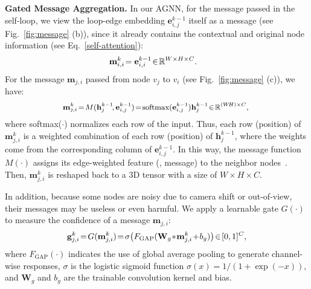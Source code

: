 \documentclass[10pt,twocolumn,letterpaper]{article}
\begin{document}
\noindent\textbf{Gated Message Aggregation.}
In our AGNN, for the message passed in the self-loop, we view the loop-edge embedding $\mathbf{e}_{i,j}^{k-1}$ itself as a message (see Fig.~\ref{fig:message} (b)), since it already contains the contextual and original node information (see Eq.~\ref{self-attention}):
	\vspace*{-3pt}
\begin{equation}
\begin{aligned}
\mathbf{m}_{i,i}^k&\!=\mathbf{e}^{k-1}_{i,i}  \!\in\!  \mathbb{R}^{ W\times H \times C}.
\label{message1}
\end{aligned}
	\vspace*{-3pt}
\end{equation}
For the message $\mathbf{m}_{j,i}$ passed from node $v_j$ to $v_i$ (see Fig.~\ref{fig:message} (c)), we have:
	\vspace*{-2pt}
\begin{equation}\small
\begin{aligned}
\!\!\mathbf{m}_{j,i}^k\!=\!M(\mathbf{h}_j^{k-1}\!, \mathbf{e}^{k-1}_{i,j}) \!=\! \text{softmax}(\mathbf{e}^{k-1}_{i,j}) \mathbf{h}_j^{k-1 }   \!\in\!  \mathbb{R}^{ (W\!H) \times C},
\label{message2}
\end{aligned}
	\vspace*{-2pt}
\end{equation}
where softmax($\cdot$) normalizes each row of the input. Thus, each row (position) of $\mathbf{m}_{j,i}^k$ is a weighted combination of each row (position) of $\mathbf{h}_j^{k-1}$, where the weights come from the corresponding column of $\mathbf{e}^{k-1}_{i,j}$.   In this way, the message function $M(\cdot)$ assigns its edge-weighted feature (\ie, message) to the neighbor nodes~\cite{velickovic2017graph}. Then, $\mathbf{m}^k_{j,i}$ is reshaped back to a 3D tensor with a size of $W\!\times\!H\!\times\!C$.

In addition, because some nodes are noisy due to camera shift or out-of-view, their messages may be useless or even harmful. We apply a learnable gate $G(\cdot)$ to measure the confidence of a message $\mathbf{m}_{j,i}$:
	\vspace*{-2pt}
\begin{equation}
\begin{aligned}
\mathbf{g}_{j,i}^k\!=\!G(\mathbf{m}_{j,i}^k)\!=\!\sigma \big(F_{\text{GAP}} (\mathbf{W}_g\!*\!\mathbf{m}_{j,i}^k\!+\!b_g) \big) \!\in\!  [0,1]^{C},
\end{aligned}	
\label{equ:gate1}
	\vspace*{-2pt}
\end{equation}
where $F_{\text{GAP}}(\cdot)$ indicates the use of global average pooling to generate channel-wise responses, $\sigma$ is the logistic sigmoid function $\sigma(x)\!=\!1/(1\!+\!\exp(-x))$, and $\mathbf{W}_g$ and $b_g$ are the trainable convolution kernel and bias.
\end{document}
